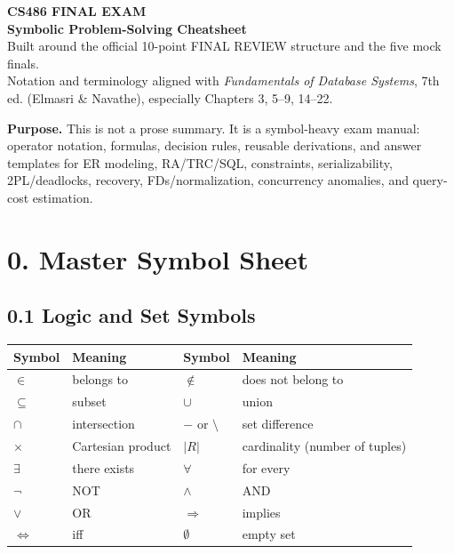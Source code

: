 \documentclass[10pt,a4paper]{article}
\begin{document}
\begin{center}
{\Huge\bfseries\color{navy} CS486 FINAL EXAM}\\[2mm]
{\LARGE\bfseries Symbolic Problem-Solving Cheatsheet}\\[2mm]
{\small Built around the official 10-point FINAL REVIEW structure and the five mock finals.}\\[1mm]
{\small Notation and terminology aligned with \emph{Fundamentals of Database Systems}, 7th ed. (Elmasri \& Navathe), especially Chapters 3, 5--9, 14--22.}
\end{center}

\begin{rulebox}
\textbf{Purpose.} This is not a prose summary. It is a symbol-heavy exam manual: operator notation, formulas, decision rules, reusable derivations, and answer templates for ER modeling, RA/TRC/SQL, constraints, serializability, 2PL/deadlocks, recovery, FDs/normalization, concurrency anomalies, and query-cost estimation.
\end{rulebox}

\tableofcontents
\newpage

\section{0. Master Symbol Sheet}

\subsection{0.1 Logic and Set Symbols}
\begin{center}
\begin{tabularx}{\textwidth}{>{\centering\arraybackslash}p{1.8cm} X >{\centering\arraybackslash}p{1.8cm} X}
\toprule
\textbf{Symbol} & \textbf{Meaning} & \textbf{Symbol} & \textbf{Meaning}\\
\midrule
$\in$ & belongs to & $\notin$ & does not belong to\\
$\subseteq$ & subset & $\cup$ & union\\
$\cap$ & intersection & $-$ or $\setminus$ & set difference\\
$\times$ & Cartesian product & $|R|$ & cardinality (number of tuples)\\
$\exists$ & there exists & $\forall$ & for every\\
$\neg$ & NOT & $\land$ & AND\\
$\lor$ & OR & $\Rightarrow$ & implies\\
$\Leftrightarrow$ & iff & $\emptyset$ & empty set\\
\bottomrule
\end{tabularx}
\end{center}
\end{document}
